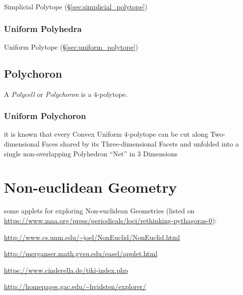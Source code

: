 Simplicial Polytope (\S\ref{sec:simplicial_polytope})



\subsubsection{Uniform Polyhedra}\label{sec:uniform_polyhedra}

\fist Uniform Polytope (\S\ref{sec:uniform_polytope})



\subsection{Polychoron}\label{sec:polychoron}

A \emph{Polycell} or \emph{Polychoron} is a $4$-polytope.



\subsubsection{Uniform Polychoron}\label{sec:uniform_polychoron}

it is known that every Convex Uniform $4$-polytope can be cut along
Two-dimensional Faces shared by its Three-dimensional Facets and unfolded into
a single non-overlapping Polyhedron ``Net'' in $3$ Dimensions



\section{Non-euclidean Geometry}\label{sec:noneuclidean_geometry}

some applets for exploring Non-euclidean Geometries (listed on
\url{https://www.maa.org/press/periodicals/loci/rethinking-pythagoras-0}):

\url{http://www.cs.unm.edu/~joel/NonEuclid/NonEuclid.html}

\url{http://merganser.math.gvsu.edu/easel/applet.html}

\url{https://www.cinderella.de/tiki-index.php}

\url{http://homepages.gac.edu/~hvidsten/explorer/}



